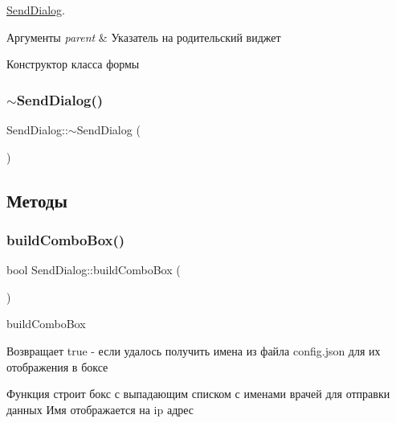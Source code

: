 \hyperlink{classSendDialog}{Send\+Dialog}. 


\begin{DoxyParams}{Аргументы}
{\em parent} & Указатель на родительский виджет\\
\hline
\end{DoxyParams}
Конструктор класса формы \mbox{\label{classSendDialog_af374a7a7ccd8b4dcdd0d567ce72c04a3}} 
\subsubsection{\texorpdfstring{$\sim$\+Send\+Dialog()}{~SendDialog()}}
{\footnotesize\ttfamily Send\+Dialog\+::$\sim$\+Send\+Dialog (\begin{DoxyParamCaption}{ }\end{DoxyParamCaption})}



\subsection{Методы}
\mbox{\label{classSendDialog_a6da8a7a2736bad8f3da4d6d8e1608f3d}} 
\subsubsection{\texorpdfstring{build\+Combo\+Box()}{buildComboBox()}}
{\footnotesize\ttfamily bool Send\+Dialog\+::build\+Combo\+Box (\begin{DoxyParamCaption}{ }\end{DoxyParamCaption})\hspace{0.3cm}{\ttfamily [private]}}



build\+Combo\+Box 

\begin{DoxyReturn}{Возвращает}
true -\/ если удалось получить имена из файла config.\+json для их отображения в боксе
\end{DoxyReturn}
Функция строит бокс с выпадающим списком с именами врачей для отправки данных Имя отображается на ip адрес \mbox{\label{classSendDialog_a7b74a8f29ac1cd411195fb9d9f48cd44}} 
